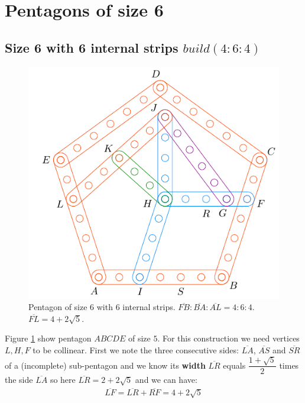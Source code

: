 \documentclass[11pt]{article}
\begin{document}

\section{Pentagons of size 6}

\subsection{Size 6 with 6 internal strips $build(4:6:4)$}

\begin{figure}[h]
\centering
\includegraphics[scale=1]{6/penta6-6a}
\caption{Pentagon of size 6 with 6 internal strips. $\overline{FB} : \overline{BA} : \overline{AL} = 4:6:4$. $\overline{FL} = 4 + 2\sqrt5$.}
\label{fig:penta6-6a}
\end{figure}

Figure \ref{fig:penta6-6a} show pentagon $ABCDE$ of size $5$. For this construction we need vertices $L,H,F$ to be collinear. First we note the three consecutive sides: $\overline{LA}$, $\overline{AS}$ and $\overline{SR}$ of a (incomplete) sub-pentagon and we know its \textbf{width} $\overline{LR}$ equals $\dfrac{1+\sqrt5}2$ times the side $\overline{LA}$ so here $\overline{LR} = 2 + 2\sqrt5$ and we can have:
\begin{align}
\overline{LF} = \overline{LR} + \overline{RF} = 4 + 2\sqrt5
\end{align}
\end{document}
